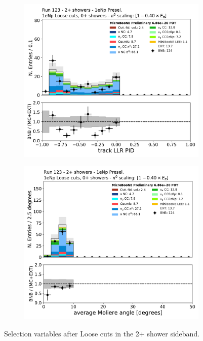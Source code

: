 \begin{figure}[H]
\begin{center}
\begin{subfigure}{0.45\textwidth}
    \end{subfigure} \\
    \begin{subfigure}{0.45\textwidth}
    \includegraphics[width=1.00\textwidth]{Sidebands/Figures/1eNp/TwoShower/TwoPShr_NP_NPLAllShr_pi0e040/trkpid.pdf}
    \end{subfigure}
    \begin{subfigure}{0.45\textwidth}
    \includegraphics[width=1.00\textwidth]{Sidebands/Figures/1eNp/TwoShower/TwoPShr_NP_NPLAllShr_pi0e040/shrmoliereavg.pdf}
    \end{subfigure}
    \caption{\label{fig:sb:1eNp:twopshr:loose:vars1} Selection variables after \npsel Loose cuts in the 2+ shower sideband.}
    \end{center}
\end{figure}

